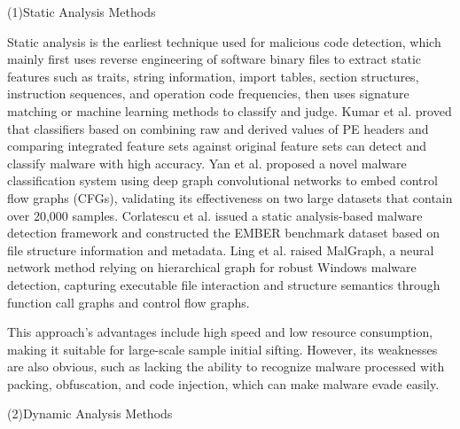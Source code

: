  
(1)Static Analysis Methods

Static analysis is the earliest technique used for malicious code detection, which mainly first uses reverse engineering of software binary files to extract static features such as traits, string information, import tables, section structures, instruction sequences, and operation code frequencies, then uses signature matching or machine learning methods to classify and judge. Kumar et al. proved that classifiers based on combining raw and derived values of PE headers and comparing integrated feature sets against original feature sets can detect and classify malware with high accuracy\cite{kumar2019learning}. Yan et al. proposed a novel malware classification system using deep graph convolutional networks to embed control flow graphs (CFGs), validating its effectiveness on two large datasets that contain over 20,000 samples\cite{yan2019classifying}. Corlatescu et al. issued a static analysis-based malware detection framework and constructed the EMBER benchmark dataset based on file structure information and metadata\cite{corlatescu2023embersim}. Ling et al. raised MalGraph, a neural network method relying on hierarchical graph for robust Windows malware detection, capturing executable file interaction and structure semantics through function call graphs and control flow graphs\cite{ling2022malgraph}.

This approach's advantages include high speed and low resource consumption, making it suitable for large-scale sample initial sifting. However, its weaknesses are also obvious, such as lacking the ability to recognize malware processed with packing, obfuscation, and code injection, which can make malware evade easily.

(2)Dynamic Analysis Methods

